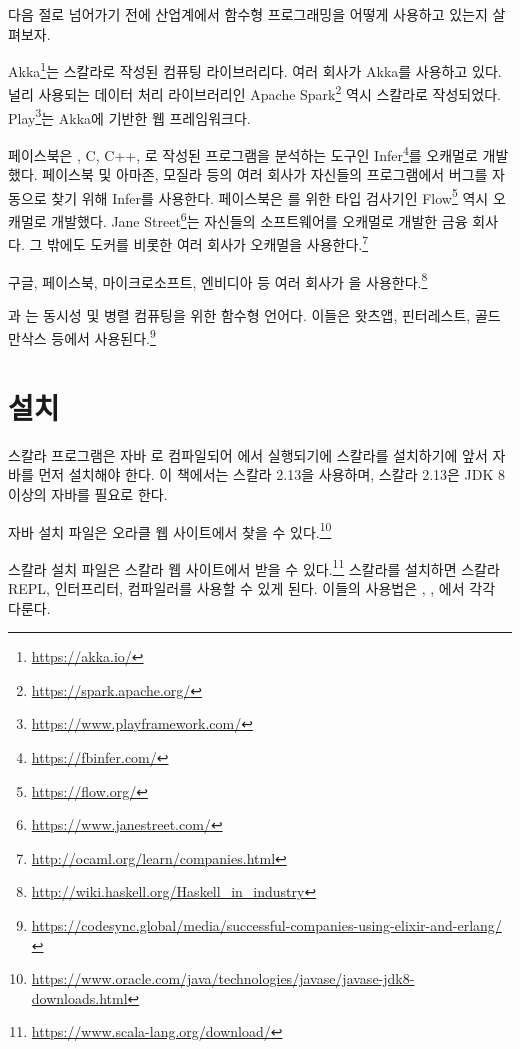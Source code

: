 다음 절로 넘어가기 전에 산업계에서 함수형 프로그래밍을 어떻게 사용하고 있는지
살펴보자.

Akka\footnote{\url{https://akka.io/}}는 스칼라로 작성된
  컴퓨팅 라이브러리다.
여러 회사가 Akka를 사용하고 있다. 널리 사용되는 데이터 처리 라이브러리인 Apache
Spark\footnote{\url{https://spark.apache.org/}} 역시 스칼라로 작성되었다.
Play\footnote{\url{https://www.playframework.com/}}는 Akka에 기반한 웹 프레임워크다.

페이스북은 , C, C++, 로 작성된 프로그램을 분석하는
도구인 Infer\footnote{\url{https://fbinfer.com/}}를 오캐멀로 개발했다. 페이스북 및 아마존, 모질라 등의 여러 회사가
자신들의 프로그램에서 버그를 자동으로 찾기 위해 Infer를 사용한다. 페이스북은
를 위한 타입 검사기인 Flow\footnote{\url{https://flow.org/}} 역시 오캐멀로 개발했다.
Jane Street\footnote{\url{https://www.janestreet.com/}}는 자신들의 소프트웨어를 오캐멀로 개발한 금융 회사다. 그 밖에도 도커를
비롯한 여러 회사가 오캐멀을 사용한다.\footnote{\url{http://ocaml.org/learn/companies.html}}

구글, 페이스북, 마이크로소프트, 엔비디아 등 여러 회사가 을
사용한다.\footnote{\url{http://wiki.haskell.org/Haskell_in_industry}}

과 는 동시성 및 병렬 컴퓨팅을 위한 함수형 언어다.
이들은 왓츠앱, 핀터레스트, 골드만삭스 등에서 사용된다.\footnote{\url{https://codesync.global/media/successful-companies-using-elixir-and-erlang/}}

\section{설치}

스칼라 프로그램은 자바 로 컴파일되어
에서
실행되기에 스칼라를 설치하기에 앞서 자바를 먼저
설치해야 한다. 이 책에서는 스칼라 2.13을 사용하며, 스칼라 2.13은 JDK 8 이상의
자바를 필요로 한다.

자바 설치 파일은 오라클 웹 사이트에서 찾을 수 있다.\footnote{\url{https://www.oracle.com/java/technologies/javase/javase-jdk8-downloads.html}}

스칼라 설치 파일은 스칼라 웹 사이트에서 받을 수 있다.\footnote{\url{https://www.scala-lang.org/download/}}
스칼라를 설치하면 스칼라
REPL, 인터프리터, 컴파일러를 사용할 수 있게 된다. 이들의 사용법은
, , 에서 각각 다룬다.

